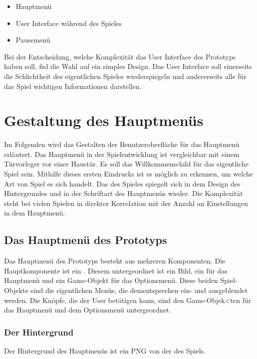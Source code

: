 \begin{itemize}
    \item Hauptmenü
    \item User Interface während des Spieles
    \item Pausemenü
\end{itemize}

\noindent
Bei der Entscheidung, welche Komplexität das User Interface des Prototyps haben soll, fiel die Wahl auf ein simples Design. 
Das User Interface soll einerseits die Schlichtheit des eigentlichen Spieles wiederspiegeln und andererseits alle für das Spiel wichtigen Informationen darstellen.

\section{Gestaltung des Hauptmenüs}

Im Folgenden wird das Gestalten der Benutzeroberfläche für das Hauptmenü erläutert. 
Das Hauptmenü in der Spielentwicklung ist vergleichbar mit einem Türvorleger vor einer Haustür. Es soll das Willkommenschild für das eigentliche Spiel sein. 
Mithilfe dieses ersten Eindrucks ist es möglich zu erkennen, um welche Art von Spiel es sich handelt. Das  des Spieles spiegelt sich in dem Design des Hintergrundes und in der Schriftart des Hauptmenüs wieder. Die Komplexität steht bei vielen Spielen in direkter Korrelation mit der Anzahl an Einstellungen in dem Hauptmenü.

\pagebreak

\subsection{Das Hauptmenü des Prototyps}

Das Hauptmenü des Prototyps besteht aus mehreren Komponenten. Die Hauptkomponente ist ein . Diesem untergeordnet ist ein Bild, ein  für das Hauptmenü und ein Game-Objekt für das Optionsmenü. Diese beiden Spiel-Objekte sind die eigentlichen Menüs, die dementsprechen ein- und ausgeblendet werden. Die Knöpfe, die der User betätigen kann, sind den Game-Objek<ten für das Hauptmenü und dem Optionsmenü untergeordnet. 

\subsubsection{Der Hintergrund}
Der Hintergrund des Hauptmenüs ist ein PNG von der  des Spiels. 
